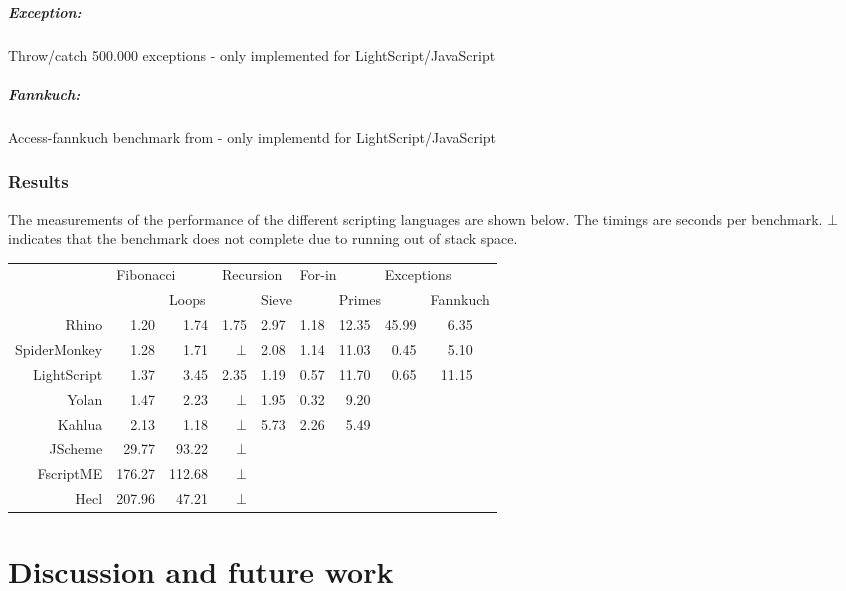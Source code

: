 \documentclass[11pt]{report}
\begin{document}
\paragraph{Exception:} Throw/catch 500.000 exceptions - only implemented for LightScript/JavaScript
\paragraph{Fannkuch:} Access-fannkuch benchmark from \cite{sunspider, shootout} - only implementd for LightScript/JavaScript

\subsection{Results}
The measurements of the performance of the different scripting languages are shown below. The timings are seconds per benchmark. $\bot$ indicates that the benchmark does not complete due to running out of stack space.

\begin{center} \begin{tabular}{|r|r|r|r|r|r|r|r|rr|} \hline 
& \multicolumn{2}{|l|}{Fibonacci} & \multicolumn{2}{|l|}{Recursion} & \multicolumn{2}{|l|}{For-in} & \multicolumn{2}{|l}{Exceptions} & \\
& & \multicolumn{2}{|l|}{Loops} & \multicolumn{2}{|l|}{Sieve} & \multicolumn{2}{|l|}{Primes} & \multicolumn{2}{|l|}{Fannkuch} \\
\hline Rhino       & 1.20 & 1.74 & 1.75   & 2.97 & 1.18 & 12.35 & 45.99 & 6.35 & \\ 
\hline SpiderMonkey& 1.28 & 1.71 & $\bot$ & 2.08 & 1.14 & 11.03 & 0.45  & 5.10 & \\ 
\hline LightScript & 1.37 & 3.45 & 2.35   & 1.19 & 0.57 & 11.70 & 0.65  & 11.15 & \\
\hline Yolan       & 1.47 & 2.23 & $\bot$ & 1.95 & 0.32 &  9.20 &  &  & \\
\hline Kahlua      & 2.13 & 1.18 & $\bot$ &  5.73 & 2.26 & 5.49 &  &  & \\ 
\hline JScheme    & 29.77 & 93.22 & $\bot$ & & & & & & \\ 
\hline FscriptME & 176.27 & 112.68& $\bot$ & & & & & & \\ 
\hline Hecl      & 207.96 & 47.21 & $\bot$ & & & & & & \\ 
\hline \end{tabular}
\end{center} 

\chapter{Discussion and future work}
\label{discussion}
\end{document}
